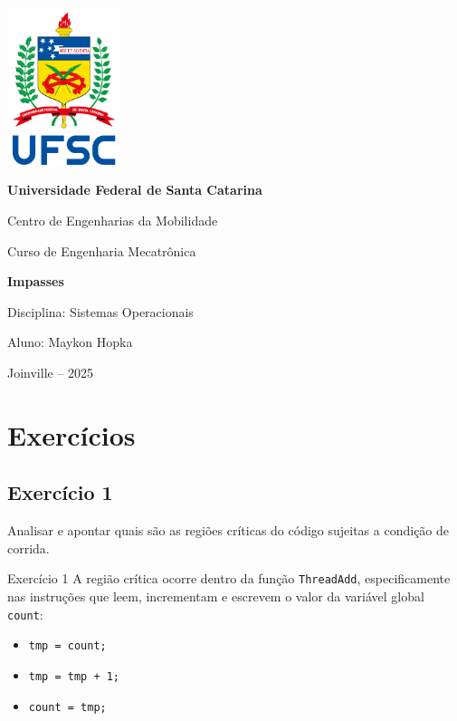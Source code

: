 \documentclass[14pt,a4paper]{article}
\begin{document}
\begin{titlepage}
    \centering
    
    \includegraphics[width=0.25\textwidth]{logo_ufsc.png}\par\vspace{1cm}
    
    {\Large\bfseries Universidade Federal de Santa Catarina \par}
    \vspace{0.5cm}
    {\large Centro de Engenharias da Mobilidade \par}
    {\large Curso de Engenharia Mecatrônica \par}
    \vfill
    
    {\Huge\bfseries Impasses \par}
    \vspace{0.5cm}
    {\Large Disciplina: Sistemas Operacionais\par}
    \vspace{0.3cm}
    {\large Aluno: Maykon Hopka \par}
    \vfill
    
    {\large Joinville – 2025}
\end{titlepage}

\section{Exercícios}

\subsection*{Exercício 1}
Analisar e apontar quais são as regiões críticas do código sujeitas a condição de corrida.

\begin{solucao}{Exercício 1}{}
A região crítica ocorre dentro da função \texttt{ThreadAdd}, especificamente nas instruções que leem, incrementam e escrevem o valor da variável global \texttt{count}:

\begin{itemize}
    \item \texttt{tmp = count;}
    \item \texttt{tmp = tmp + 1;}
    \item \texttt{count = tmp;}
\end{itemize}

\end{solucao}
\end{document}
